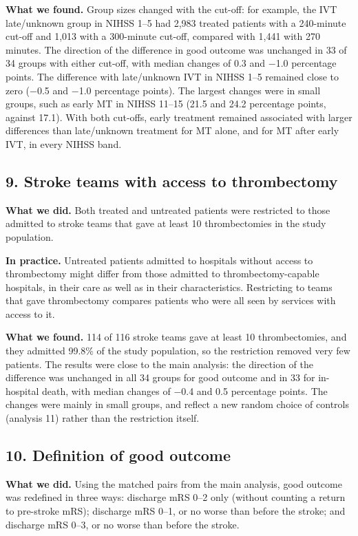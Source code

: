 \textbf{What we found.} Group sizes changed with the cut-off: for example, the IVT late/unknown group in NIHSS 1--5 had 2,983 treated patients with a 240-minute cut-off and 1,013 with a 300-minute cut-off, compared with 1,441 with 270 minutes. The direction of the difference in good outcome was unchanged in 33 of 34 groups with either cut-off, with median changes of 0.3 and $-$1.0 percentage points. The difference with late/unknown IVT in NIHSS 1--5 remained close to zero ($-$0.5 and $-$1.0 percentage points). The largest changes were in small groups, such as early MT in NIHSS 11--15 (21.5 and 24.2 percentage points, against 17.1). With both cut-offs, early treatment remained associated with larger differences than late/unknown treatment for MT alone, and for MT after early IVT, in every NIHSS band.

\subsection*{9. Stroke teams with access to thrombectomy}

\textbf{What we did.} Both treated and untreated patients were restricted to those admitted to stroke teams that gave at least 10 thrombectomies in the study population.

\textbf{In practice.} Untreated patients admitted to hospitals without access to thrombectomy might differ from those admitted to thrombectomy-capable hospitals, in their care as well as in their characteristics. Restricting to teams that gave thrombectomy compares patients who were all seen by services with access to it.

\textbf{What we found.} 114 of 116 stroke teams gave at least 10 thrombectomies, and they admitted 99.8\% of the study population, so the restriction removed very few patients. The results were close to the main analysis: the direction of the difference was unchanged in all 34 groups for good outcome and in 33 for in-hospital death, with median changes of $-$0.4 and 0.5 percentage points. The changes were mainly in small groups, and reflect a new random choice of controls (analysis 11) rather than the restriction itself.

\subsection*{10. Definition of good outcome}

\textbf{What we did.} Using the matched pairs from the main analysis, good outcome was redefined in three ways: discharge mRS 0--2 only (without counting a return to pre-stroke mRS); discharge mRS 0--1, or no worse than before the stroke; and discharge mRS 0--3, or no worse than before the stroke.

